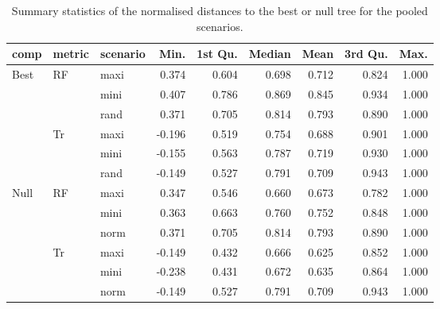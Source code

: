 \begin{table}[ht]
\centering
\begin{tabular}{lllrrrrrr}
  \hline
comp & metric & scenario & Min. & 1st Qu. & Median & Mean & 3rd Qu. & Max. \\ 
  \hline
Best & RF & maxi & 0.374 & 0.604 & 0.698 & 0.712 & 0.824 & 1.000 \\ 
   &  & mini & 0.407 & 0.786 & 0.869 & 0.845 & 0.934 & 1.000 \\ 
   &  & rand & 0.371 & 0.705 & 0.814 & 0.793 & 0.890 & 1.000 \\ 
   & Tr & maxi & -0.196 & 0.519 & 0.754 & 0.688 & 0.901 & 1.000 \\ 
   &  & mini & -0.155 & 0.563 & 0.787 & 0.719 & 0.930 & 1.000 \\ 
   &  & rand & -0.149 & 0.527 & 0.791 & 0.709 & 0.943 & 1.000 \\ 
  Null & RF & maxi & 0.347 & 0.546 & 0.660 & 0.673 & 0.782 & 1.000 \\ 
   &  & mini & 0.363 & 0.663 & 0.760 & 0.752 & 0.848 & 1.000 \\ 
   &  & norm & 0.371 & 0.705 & 0.814 & 0.793 & 0.890 & 1.000 \\ 
   & Tr & maxi & -0.149 & 0.432 & 0.666 & 0.625 & 0.852 & 1.000 \\ 
   &  & mini & -0.238 & 0.431 & 0.672 & 0.635 & 0.864 & 1.000 \\ 
   &  & norm & -0.149 & 0.527 & 0.791 & 0.709 & 0.943 & 1.000 \\ 
   \hline
\end{tabular}
\caption{Summary statistics of the normalised distances to the best or null tree for the pooled scenarios.} 
\label{Full_Tab_pooledscenarios}
\end{table}

